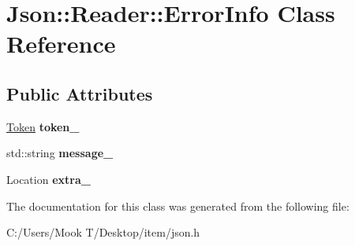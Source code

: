 \hypertarget{class_json_1_1_reader_1_1_error_info}{}\section{Json\+:\+:Reader\+:\+:Error\+Info Class Reference}
\label{class_json_1_1_reader_1_1_error_info}
\subsection*{Public Attributes}
\begin{DoxyCompactItemize}
\item 
\hypertarget{class_json_1_1_reader_1_1_error_info_a52e1c71b12eb1c3f0395d7ef1e778ce6}{}\hyperlink{class_json_1_1_reader_1_1_token}{Token} {\bfseries token\+\_\+}\label{class_json_1_1_reader_1_1_error_info_a52e1c71b12eb1c3f0395d7ef1e778ce6}

\item 
\hypertarget{class_json_1_1_reader_1_1_error_info_aeb2fb6537a8bb978b239ea1482d73d7a}{}std\+::string {\bfseries message\+\_\+}\label{class_json_1_1_reader_1_1_error_info_aeb2fb6537a8bb978b239ea1482d73d7a}

\item 
\hypertarget{class_json_1_1_reader_1_1_error_info_af92c24acf642b040d6e40aac4952d44d}{}Location {\bfseries extra\+\_\+}\label{class_json_1_1_reader_1_1_error_info_af92c24acf642b040d6e40aac4952d44d}

\end{DoxyCompactItemize}


The documentation for this class was generated from the following file\+:\begin{DoxyCompactItemize}
\item 
C\+:/\+Users/\+Mook T/\+Desktop/item/json.\+h\end{DoxyCompactItemize}
